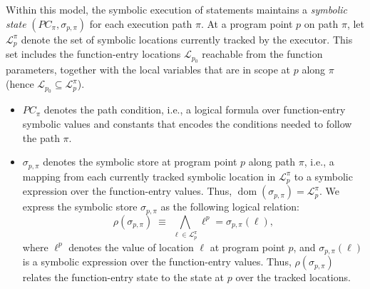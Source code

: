 

Within this model, the symbolic execution of statements maintains a
\emph{symbolic state} $(PC_\pi, \sigma_{p,\pi})$ for each execution
path $\pi$.
At a program point $p$ on path $\pi$, let $\mathcal{L}^{\pi}_{p}$
denote the set of symbolic locations currently tracked by the
executor. This set includes the {function-entry locations}
$\mathcal{L}_{p_0}$ reachable from the function parameters,
together with the local variables {that are in scope at
$p$ along $\pi$} (hence
$\mathcal{L}_{p_0}\subseteq\mathcal{L}^{\pi}_{p}$).

\begin{itemize}
\item $PC_\pi$ denotes the path condition, i.e., a logical formula
over function-entry symbolic values and constants that encodes
the conditions needed to follow the path $\pi$.

\item $\sigma_{p,\pi}$ denotes the symbolic store at program
point $p$ along path $\pi$, i.e., a mapping from each currently
tracked symbolic location in $\mathcal{L}^{\pi}_{p}$ to a
symbolic expression over the function-entry values.
{Thus,
$\operatorname{dom}(\sigma_{p,\pi})=\mathcal{L}^{\pi}_{p}$.
We express the symbolic store $\sigma_{p,\pi}$ as the following
logical relation:
\[
\rho(\sigma_{p,\pi})
\;\equiv\;
\bigwedge_{\ell\in\mathcal{L}^{\pi}_{p}}
\ell^p=\sigma_{p,\pi}(\ell),
\]
where $\ell^p$ denotes the value of location $\ell$ at program
point $p$, and $\sigma_{p,\pi}(\ell)$ is a symbolic expression
over the function-entry values. Thus, $\rho(\sigma_{p,\pi})$
relates the function-entry state to the state at $p$ over
the tracked locations.}
\end{itemize}

